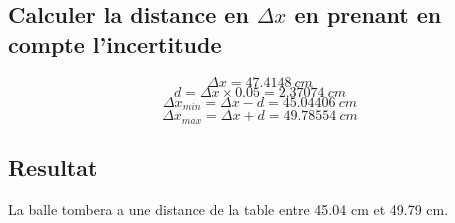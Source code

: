\documentclass{article}
\begin{document}
                \subsection{Calculer la distance en $\Delta x$ en prenant en compte l'incertitude}
                    \setcounter{equation}{0}
                    \vspace{4mm}
                    \begin{equation}
                       \Delta x = 47.4148 \ cm
                    \end{equation}
                    \vspace{2mm}
                    \begin{equation}
                        d = \Delta x \times 0.05 = 2.37074 \ cm
                    \end{equation}
                    \vspace{2mm}
                    \begin{equation}
                        \Delta x_{min} = \Delta x - d = 45.04406 \ cm
                    \end{equation}
                    \vspace{1mm}
                    \begin{equation}
                        \Delta x_{max} = \Delta x + d = 49.78554 \ cm
                    \end{equation}
                    \vspace{2mm}
                \subsection{Resultat}
                    \hspace{11mm} La balle tombera a une distance de la table entre 45.04 cm et 49.79 cm.
\end{document}
